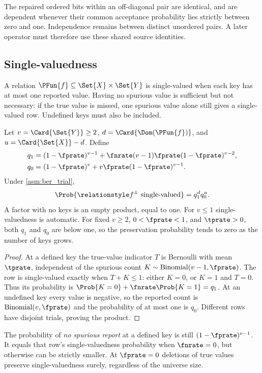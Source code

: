 \documentclass[ ../main.tex]{subfiles}
\begin{document}
The repaired ordered bits within an off-diagonal pair are identical, and are
dependent whenever their common acceptance probability lies strictly between
zero and one. Independence remains between distinct unordered pairs. A later
operator must therefore use these shared source identities.

\subsection{Single-valuedness}
\label{sec:functional}
A relation $\PFun{f}\subseteq\Set{X}\times\Set{Y}$ is single-valued when each
key has at most one reported value. Having no spurious value is sufficient but
not necessary: if the true value is missed, one spurious value alone still
gives a single-valued row. Undefined keys must also be included.

\begin{theorem}
\label{thm:functional}
Let $v=\Card{\Set{Y}}\ge2$, $d=\Card{\Dom(\PFun{f})}$, and
$u=\Card{\Set{X}}-d$. Define
\begin{align}
 q_1&=(1-\fprate)^{v-1}
       +\fnrate(v-1)\fprate(1-\fprate)^{v-2},\\
 q_0&=(1-\fprate)^v+v\fprate(1-\fprate)^{v-1}.
\end{align}
Under \cref{asm:ber_trial},
\begin{equation}
 \Prob{\ARelation{f}\text{ single-valued}}=q_1^d q_0^u.
\end{equation}
A factor with no keys is an empty product, equal to one.
For $v\le1$ single-valuedness is automatic. For fixed $v\ge2$,
$0<\fprate<1$, and $\tprate>0$, both $q_1$ and $q_0$ are below one, so the
preservation probability tends to zero as the number of keys grows.
\end{theorem}
\begin{proof}
At a defined key the true-value indicator $T$ is Bernoulli with mean $\tprate$,
independent of the spurious count $K\sim\operatorname{Binomial}(v-1,\fprate)$.
The row is single-valued exactly when $T+K\le1$: either $K=0$, or $K=1$ and
$T=0$. Thus its probability is $\Prob{K=0}+\fnrate\Prob{K=1}=q_1$.
At an undefined key every value is negative, so the reported count is
$\operatorname{Binomial}(v,\fprate)$ and the probability of at most one is
$q_0$. Different rows have disjoint trials, proving the product.
\end{proof}

The probability of \emph{no spurious report} at a defined key is still
$(1-\fprate)^{v-1}$. It equals that row's single-valuedness probability when
$\fnrate=0$, but otherwise can be strictly smaller. At $\fprate=0$ deletions
of true values preserve single-valuedness surely, regardless of the universe
size.
\end{document}

